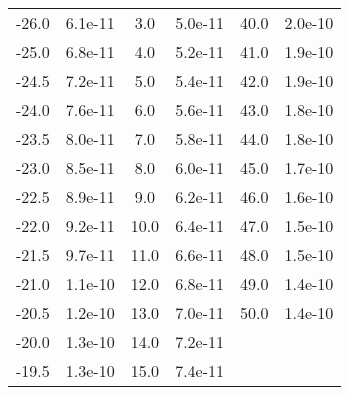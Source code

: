 \begin{table}
\begin{tabular}{cc|cc|cc}
 -26.0 & 6.1e-11 &   3.0 &  5.0e-11 & 40.0 &  2.0e-10 \\
 -25.0 & 6.8e-11 &   4.0 &  5.2e-11 & 41.0 &  1.9e-10 \\
 -24.5 & 7.2e-11 &   5.0 &  5.4e-11 & 42.0 &  1.9e-10 \\
 -24.0 & 7.6e-11 &   6.0 &  5.6e-11 & 43.0 &  1.8e-10 \\
 -23.5 & 8.0e-11 &   7.0 &  5.8e-11 & 44.0 &  1.8e-10 \\
 -23.0 & 8.5e-11 &   8.0 &  6.0e-11 & 45.0 &  1.7e-10 \\
 -22.5 & 8.9e-11 &   9.0 &  6.2e-11 & 46.0 &  1.6e-10 \\
 -22.0 & 9.2e-11 &  10.0 &  6.4e-11 & 47.0 &  1.5e-10 \\
 -21.5 & 9.7e-11 &  11.0 &  6.6e-11 & 48.0 &   1.5e-10 \\
 -21.0 & 1.1e-10 &  12.0 &  6.8e-11 & 49.0 &  1.4e-10 \\
 -20.5 & 1.2e-10 &  13.0 &  7.0e-11&  50.0 &  1.4e-10 \\
 -20.0 & 1.3e-10 &  14.0 &  7.2e-11 & & \\
 -19.5 & 1.3e-10 &  15.0 &  7.4e-11 & &
\end{tabular}
\end{table}
